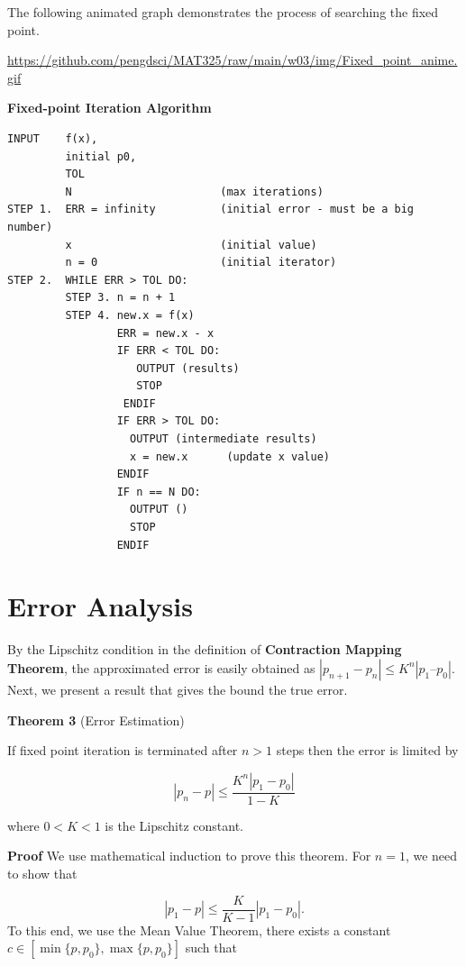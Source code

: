 \documentclass[
]{book}
\begin{document}
The following animated graph demonstrates the process of searching the fixed point.

\url{https://github.com/pengdsci/MAT325/raw/main/w03/img/Fixed_point_anime.gif}

\textbf{Fixed-point Iteration Algorithm}

\begin{verbatim}
INPUT    f(x), 
         initial p0, 
         TOL
         N                       (max iterations)
STEP 1.  ERR = infinity          (initial error - must be a big number)
         x                       (initial value)
         n = 0                   (initial iterator)
STEP 2.  WHILE ERR > TOL DO:
         STEP 3. n = n + 1
         STEP 4. new.x = f(x)
                 ERR = new.x - x
                 IF ERR < TOL DO:
                    OUTPUT (results)
                    STOP
                  ENDIF
                 IF ERR > TOL DO:
                   OUTPUT (intermediate results)
                   x = new.x      (update x value)
                 ENDIF
                 IF n == N DO:
                   OUTPUT ()
                   STOP
                 ENDIF
\end{verbatim}

\hfill\break

\hypertarget{error-analysis-2}{%
\section{Error Analysis}\label{error-analysis-2}}

\hfill\break

By the Lipschitz condition in the definition of \textbf{Contraction Mapping Theorem}, the approximated error is easily obtained as \(|p_{n+1} - p_n| \le K^n|p_1 – p_0|\). Next, we present a result that gives the bound the true error.

\textbf{Theorem 3} (Error Estimation)

If fixed point iteration is terminated after \(n > 1\) steps then the error is limited by

\[
|p_n-p| \le \frac{K^n|p_1-p_0|}{1-K}
\]

where \(0< K < 1\) is the Lipschitz constant.

\textbf{Proof} We use mathematical induction to prove this theorem. For \(n = 1\), we need to show that

\[
|p_1 - p| \le \frac{K}{K-1}|p_1-p_0|.
\] To this end, we use the Mean Value Theorem, there exists a constant \(c \in [\min\{p, p_0\}, \max\{p, p_0\}]\) such that
\end{document}
